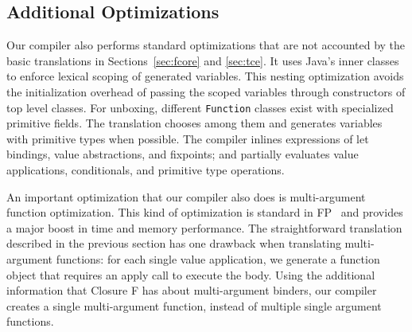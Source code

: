 



\subsection{Additional Optimizations}

Our compiler also performs standard optimizations that are not
accounted by the basic translations in Sections~\ref{sec:fcore} and
\ref{sec:tce}. It uses Java's inner classes to enforce lexical scoping
of generated variables. This nesting optimization avoids the initialization overhead
of passing the scoped variables through constructors of top level classes.
 For unboxing, different \lstinline{Function} classes exist
with specialized primitive fields. The translation chooses among them
and generates variables with primitive types when possible. The
compiler inlines expressions of let bindings, value abstractions, and
fixpoints; and partially evaluates value applications, conditionals,
and primitive type operations.

An important optimization that our compiler also does is
multi-argument function optimization. This kind of optimization is
standard in FP~\cite{marlow06making} and provides a major boost in
time and memory performance. The straightforward
translation described in the previous section has one drawback when
translating multi-argument functions: for each single value
application, we generate a function object that requires an apply call
to execute the body. Using the additional information that Closure F
has about multi-argument binders, our compiler creates a single
multi-argument function, instead of multiple single argument
functions. 

